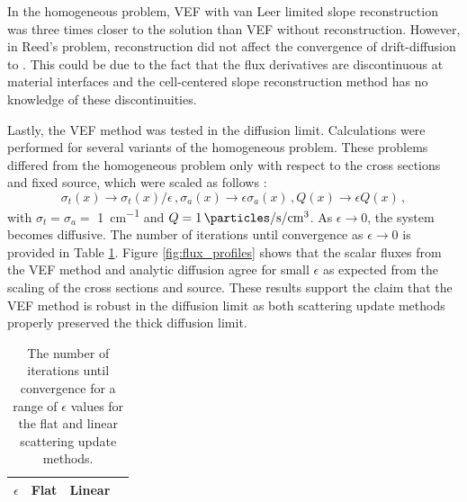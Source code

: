 In the homogeneous problem, VEF with van Leer limited slope reconstruction was three times closer to the \SN solution than VEF without reconstruction. However, in Reed's problem, reconstruction did not affect the convergence of drift-diffusion to \SN. This could be due to the fact that the flux derivatives are discontinuous at material interfaces and the cell-centered slope reconstruction method has no knowledge of these discontinuities. 

Lastly, the VEF method was tested in the diffusion limit. Calculations were performed for several variants of the homogeneous problem. 
These problems differed from the homogeneous problem only with respect to the cross sections and fixed source, which were scaled as follows \cite{diflim}: 
	\begin{subequations} \label{res:scaling}
		\begin{equation} 
			\sigma_t(x) \rightarrow \sigma_t(x)/\epsilon \,, 
		\end{equation}
		\begin{equation}
			\sigma_a(x) \rightarrow \epsilon \sigma_a(x) \,,
		\end{equation}
		\begin{equation}
			Q(x) \rightarrow \epsilon Q(x) \,, 
		\end{equation}
	\end{subequations}
with $\sigma_t=\sigma_a=$ \SI{1}{cm^{-1}} and $Q = \SI{1}{\particles\per\second\per\cm\cubed}$.  As $\epsilon \rightarrow 0$, the system becomes diffusive. The number of iterations until convergence as $\epsilon \rightarrow 0$ is provided in Table \ref{tab:diffLim}. Figure \ref{fig:flux_profiles} shows that the scalar fluxes from the VEF method and analytic diffusion agree for small $\epsilon$ as expected from the scaling of the cross sections and source. 
These results support the claim that the VEF method is robust in the diffusion limit as both scattering update methods properly preserved the thick diffusion limit. 
	\begin{table}[htb]
	\centering
	\begin{tabular}{|c|c|c|c|}
	\hline
	\hline
	$\epsilon$ & Flat & Linear \\ 
	\hline
		
	\hline
	\hline
	\end{tabular}
	\caption{The number of iterations until convergence for a range of $\epsilon$ values for the flat and linear scattering update methods. }
	\label{tab:diffLim}
	\end{table}
	
